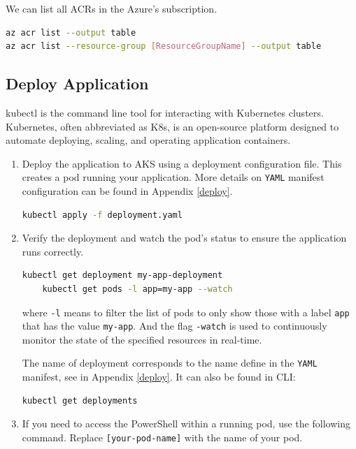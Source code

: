 \documentclass{article}
\begin{document}
We can list all ACRs in the Azure's subscription.
\begin{lstlisting}[language=bash]
az acr list --output table
az acr list --resource-group [ResourceGroupName] --output table
\end{lstlisting}

\subsection{Deploy Application} 

 
kubectl is the command line tool for interacting with Kubernetes clusters. Kubernetes, often abbreviated as K8s, is an open-source platform designed to automate deploying, scaling, and operating application containers.

\begin{enumerate}
    \item Deploy the application to AKS using a deployment configuration file. This creates a pod running your application. More details on \texttt{YAML} manifest configuration can be found in Appendix \ref{deploy}.  
    
    \begin{lstlisting}[language=bash]
    kubectl apply -f deployment.yaml
    \end{lstlisting}
    
    \item Verify the deployment and watch the pod's status to ensure the application runs correctly. 
    \begin{lstlisting}[language=bash]
    kubectl get deployment my-app-deployment
    kubectl get pods -l app=my-app --watch
    \end{lstlisting}
where \texttt{-l} means to filter the list of pods to only show those with a label \texttt{app} that has the value \texttt{my-app}.   And the flag \texttt{-watch} is used to continuously monitor the state of the specified resources in real-time.
  
 The name of deployment corresponds to the name define in the \texttt{YAML} manifest, see in Appendix \ref{deploy}. It can also be found in CLI:
     \begin{lstlisting}[language=bash]
    kubectl get deployments
    \end{lstlisting}
    \item If you need to access the PowerShell within a running pod, use the following command. Replace \texttt{[your-pod-name]} with the name of your pod.
    

\end{enumerate}
\end{document}
